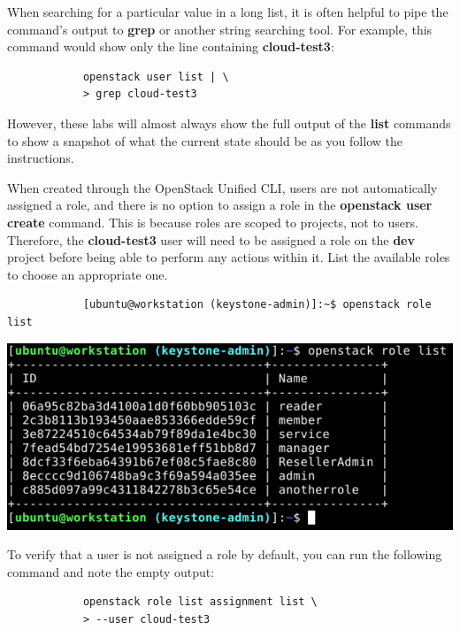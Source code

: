 \documentclass[letterpaper, 12pt]{article}
\begin{document}
\begin{enumerate}
    \begin{tipbox}
        When searching for a particular value in a long list, it is often helpful to pipe the command's output to \textbf{grep} or another string searching tool.
        For example, this command would show only the line containing \textbf{cloud-test3}:
        \begin{lstlisting}
            openstack user list | \
            > grep cloud-test3
        \end{lstlisting}
        However, these labs will almost always show the full output of the \textbf{list} commands to show a snapshot of what the current state should be as you follow the instructions.
    \end{tipbox}

    \begin{labstep}

        When created through the OpenStack Unified CLI, users are not automatically assigned a role, and there is no option to assign a role in the \textbf{openstack user create} command.
        This is because roles are scoped to projects, not to users.
        Therefore, the \textbf{cloud-test3} user will need to be assigned a role on the \textbf{dev} project before being able to perform any actions within it.
        List the available roles to choose an appropriate one.
        \begin{lstlisting}
            [ubuntu@workstation (keystone-admin)]:~$ openstack role list
        \end{lstlisting}

        \begin{center}
            \includegraphics[width=\linewidth]{images/part4/step6.png}
        \end{center}
    \end{labstep}

    \begin{tipbox}
        To verify that a user is not assigned a role by default, you can run the following command and note the empty output:
        \begin{lstlisting}
            openstack role list assignment list \
            > --user cloud-test3
        \end{lstlisting}
    \end{tipbox}


\end{enumerate}
\end{document}
